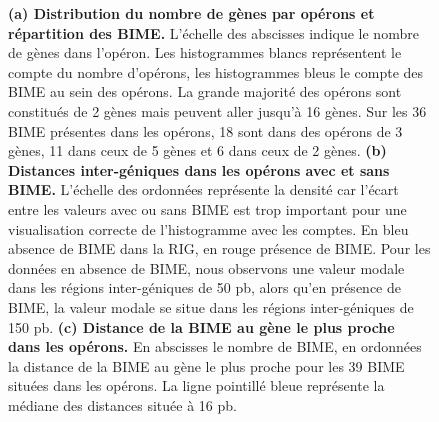 \documentclass[12pt,a4paper]{report}
\begin{document}
\begin{onehalfspace}
\begin{figure}[h!]
\caption{\textbf{(a) Distribution du nombre de gènes par opérons et répartition des BIME.} L'échelle des abscisses indique le nombre de gènes dans l'opéron. Les histogrammes blancs représentent le compte du nombre d'opérons, les histogrammes bleus le compte des BIME au sein des opérons. La grande majorité des opérons sont constitués de 2 gènes mais peuvent aller jusqu'à 16 gènes. Sur les 36 BIME présentes dans les opérons, 18 sont dans des opérons de 3 gènes, 11 dans ceux de 5 gènes et 6 dans ceux de 2 gènes. \textbf{(b) Distances inter-géniques dans les opérons avec et sans BIME.} L'échelle des ordonnées représente la densité car l'écart entre les valeurs avec ou sans BIME est trop important pour une visualisation correcte de l'histogramme avec les comptes. En bleu absence de BIME dans la RIG, en rouge présence de BIME. Pour les données en absence de BIME, nous observons une valeur modale dans les régions inter-géniques de 50 pb, alors qu'en présence de BIME, la valeur modale se situe dans les régions inter-géniques de 150 pb. \textbf{(c) Distance de la BIME au gène le plus proche dans les opérons.} En abscisses le nombre de BIME, en ordonnées la distance de la BIME au gène le plus proche pour les 39 BIME situées dans les opérons. La ligne pointillé bleue représente la médiane des distances située à 16 pb.
\label{fig:operon}}
\end{figure}


\end{onehalfspace}
\end{document}
